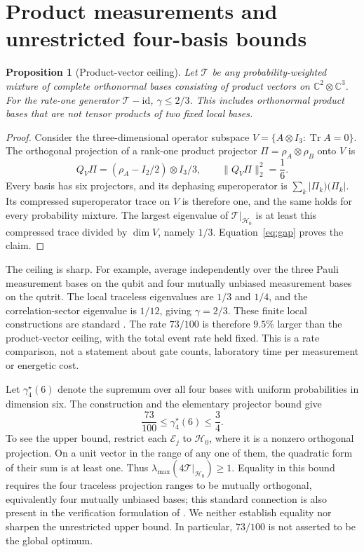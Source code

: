 \documentclass[11pt,a4paper]{article}
\newtheorem{proposition}[theorem]{Proposition}
\theoremstyle{remark}
\DeclareMathOperator{\Tr}{Tr}
\newcommand{\id}{\mathrm{id}}
\newcommand{\C}{\mathbb C}
\newcommand{\E}{\mathcal E}
\newcommand{\T}{\mathcal T}
\newcommand{\HH}{\mathcal H_0}
\begin{document}
\section{Product measurements and unrestricted four-basis bounds}
\begin{proposition}[Product-vector ceiling]\label{prop:product}
Let $\T$ be any probability-weighted mixture of complete orthonormal bases consisting of product vectors on $\C^2\otimes\C^3$. For the rate-one generator $\T-\id$, $\gamma\le2/3$. This includes orthonormal product bases that are not tensor products of two fixed local bases.
\end{proposition}
\begin{proof}
Consider the three-dimensional operator subspace
$V=\{A\otimes I_3:\Tr A=0\}$. The orthogonal projection of a rank-one product projector $\Pi=\rho_A\otimes\rho_B$ onto $V$ is
\[
 Q_V\Pi=(\rho_A-I_2/2)\otimes I_3/3,
 \qquad \|Q_V\Pi\|_2^2=\frac16.
\]
Every basis has six projectors, and its dephasing superoperator is $\sum_k|\Pi_k)(\Pi_k|$. Its compressed superoperator trace on $V$ is therefore one, and the same holds for every probability mixture. The largest eigenvalue of $\T|_{\HH}$ is at least this compressed trace divided by $\dim V$, namely $1/3$. Equation~\eqref{eq:gap} proves the claim.
\end{proof}
The ceiling is sharp. For example, average independently over the three Pauli measurement bases on the qubit and four mutually unbiased measurement bases on the qutrit. The local traceless eigenvalues are $1/3$ and $1/4$, and the correlation-sector eigenvalue is $1/12$, giving $\gamma=2/3$. These finite local constructions are standard \cite{wootters}. The rate $73/100$ is therefore $9.5\%$ larger than the product-vector ceiling, with the total event rate held fixed. This is a rate comparison, not a statement about gate counts, laboratory time per measurement or energetic cost.

Let $\gamma_4^\star(6)$ denote the supremum over all four bases with uniform probabilities in dimension six. The construction and the elementary projector bound give
\begin{equation}\label{eq:globalbounds}
 \frac{73}{100}\le\gamma_4^\star(6)\le\frac34.
\end{equation}
To see the upper bound, restrict each $\E_j$ to $\HH$, where it is a nonzero orthogonal projection. On a unit vector in the range of any one of them, the quadratic form of their sum is at least one. Thus $\lambda_{\max}(4\T|_{\HH})\ge1$.
Equality in this bound requires the four traceless projection ranges to be mutually orthogonal, equivalently four mutually unbiased bases; this standard connection is also present in the verification formulation of \cite{zhu}. We neither establish equality nor sharpen the unrestricted upper bound. In particular, $73/100$ is not asserted to be the global optimum.
\end{document}
